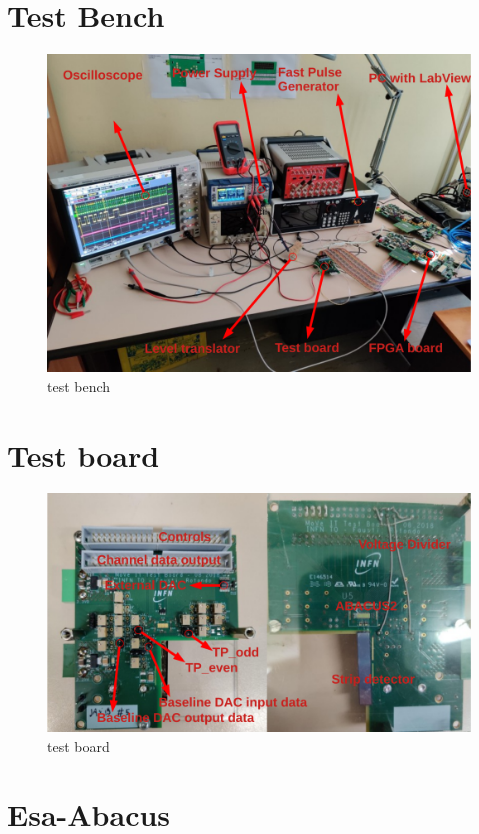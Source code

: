 \section{Test Bench}\label{testbench}
\begin{figure}[H]
	\centering
	\includegraphics[width=0.7\linewidth]{IMG/ch4/TESTBENCH}
	\caption{test bench}
	\label{fig:testbench}
\end{figure}

\section{Test board}\label{testboard}
\begin{figure}[H]
	\centering
	\includegraphics[width=0.7\linewidth]{IMG/ch4/TESTBOARD}
	\caption{test board}
	\label{fig:testboard}
\end{figure}

\section{Esa-Abacus}
